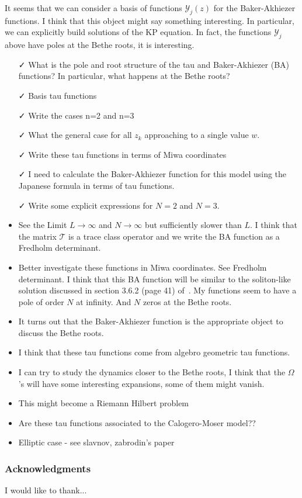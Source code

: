 \documentclass[a4paper,11pt]{amsart}
\begin{document}
It seems that we can consider a basis of functions \(\mathcal{Y}_j(z)\) for the Baker-Akhiezer
functions. I think that this object might say something interesting. In particular, we can
explicitly build solutions of the KP equation. In fact, the functions \(\mathcal{Y}_j\)
above have poles at the Bethe roots, it is interesting. 
\begin{itemize}
\item[\faCheck] What is the pole and root structure of the tau and Baker-Akhiezer (BA) functions?
  In particular, what happens at the Bethe roots?
\item[\faCheck] Basis tau functions
\item[\faCheck] Write the cases n=2 and n=3
\item[\faCheck] What the general case for all \(z_k\) approaching to a single
  value \(w\). 
\item[\faCheck] Write these tau functions in terms of Miwa coordinates
\item[\faCheck] I need to calculate the Baker-Akhiezer function for this model using the Japanese formula
  in terms of tau functions.
\item[\faCheck]  Write some explicit expressions for \(N=2\) and \(N=3\). 
\item See the Limit \(L \to \infty\) and \(N \to \infty\) but sufficiently slower than \(L\). 
  I think that the matrix \(\mathcal{T}\) is a trace class operator and we write the BA function
  as a Fredholm determinant. 
\item Better investigate these functions in Miwa coordinates. See Fredholm determinant. 
  I think that this BA function will be similar to the soliton-like solution discussed in section 3.6.2 (page 41) of~\cite{Zabrodin2018}. 
  My functions seem to have a pole of order \(N\) at infinity. And \(N\) zeros at the Bethe roots. 
\item It turns out that the Baker-Akhiezer function is the appropriate object to discuss
  the Bethe roots. 
  \item I think that these tau functions come from algebro geometric tau functions. 
  \item I can try to study the dynamics closer to the Bethe roots, I think that the
    \(\Omega\)'s will have some interesting expansions, some of them might vanish. 
  \item This might become a Riemann Hilbert problem
  \item Are these tau functions associated to the Calogero-Moser model??
  \item Elliptic case - see slavnov, zabrodin's paper
\end{itemize}





\subsubsection*{Acknowledgments}
I would like to thank...

\printbibliography
\end{document}
